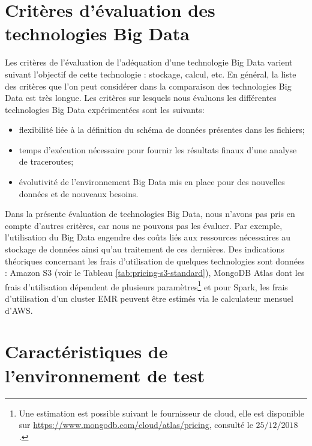 
\section{Critères d'évaluation des technologies  Big Data}
Les critères de l'évaluation de l'adéquation d'une technologie Big Data  varient  suivant  l'objectif de cette technologie : stockage, calcul, etc.  En général, la liste des critères que l'on peut considérer dans la comparaison des technologies Big Data est très longue.  Les critères sur lesquels nous  évaluons  les différentes technologies  Big Data expérimentées sont les suivants:
\begin{itemize}
	\item flexibilité liée à la définition du  schéma de  données présentes dans les fichiers;
	\item temps d'exécution nécessaire pour fournir les résultats finaux d'une analyse de traceroutes;
	\item évolutivité de l'environnement Big Data mis en place pour des nouvelles données et de nouveaux besoins.
\end{itemize}

Dans la présente évaluation de  technologies Big Data, nous n'avons pas pris en compte d'autres critères, car nous ne pouvons pas les évaluer. Par exemple, l'utilisation du  Big Data engendre des coûts  liés aux ressources nécessaires au stockage de données  ainsi qu'au traitement de ces dernières. Des indications théoriques concernant les frais d'utilisation de quelques technologies sont données
 : Amazon S3 (voir le Tableau \ref{tab:pricing-s3-standard}),  MongoDB Atlas dont les frais d'utilisation  dépendent de plusieurs paramètres\footnote{Une estimation est possible suivant le fournisseur de cloud, elle est disponible  sur \url{https://www.mongodb.com/cloud/atlas/pricing}, consulté le $25/12/2018$.} et pour Spark, les frais d'utilisation d'un cluster EMR peuvent être estimés via le  calculateur mensuel d'AWS. 

\section{Caractéristiques de l'environnement de test} \label{machine-openvz-caracteritics}

